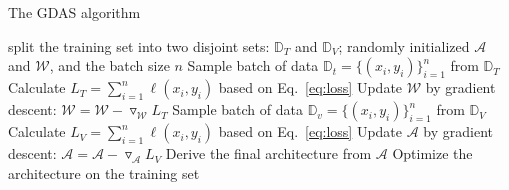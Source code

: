 \documentclass[10pt,twocolumn,letterpaper]{article}
\def\Eqref#1{Eq.~\eqref{#1}}
\def\gA{{\mathcal{A}}}
\def\gW{{\mathcal{W}}}
\def\sD{{\mathbb{D}}}
\begin{document}
\begin{algorithm}[t]
\small
\caption{The GDAS algorithm}
\label{alg:Train}

  \begin{algorithmic}
\Require split the training set into two disjoint sets: $\sD_{T}$ and $\sD_{V}$; randomly initialized $\gA$ and $\gW$, and the batch size $n$
     
    	\State Sample batch of data {$\sD_{t} = \{ (x_{i},y_{i})\}_{i=1}^{n}$ from $\sD_{T}$}
    	\State Calculate $L_{T}=\sum_{i=1}^{n} \ell(x_{i},y_{i})$ based on \Eqref{eq:loss}
    	\State Update $\gW$ by gradient descent: $\gW=\gW - \triangledown_{\gW} L_{T}$
    	\State Sample batch of data {$\sD_{v} = \{ (x_{i},y_{i})\}_{i=1}^{n}$ from $\sD_{V}$}
    	\State Calculate $L_{V}=\sum_{i=1}^{n} \ell(x_{i},y_{i})$ based on \Eqref{eq:loss}
    	\State Update $\gA$ by gradient descent: $\gA=\gA - \triangledown_{\gA} L_{V}$
    \EndWhile
    \State Derive the final architecture from $\gA$
    \State Optimize the architecture on the training set
  \end{algorithmic}
  
\end{algorithm}
\end{document}
